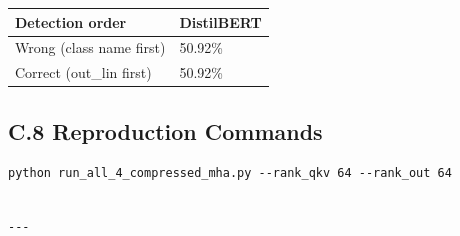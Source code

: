 \begin{table}[H]
\centering
\small
\begin{tabular}{ll}
\toprule
\textbf{Detection order} & \textbf{DistilBERT} \\
\midrule
Wrong (class name first) & 50.92\% \\
Correct (out\_lin first) & 50.92\% \\
\bottomrule
\end{tabular}
\end{table}

\subsection{C.8 Reproduction Commands}

\begin{lstlisting}
python run_all_4_compressed_mha.py --rank_qkv 64 --rank_out 64
\end{lstlisting}
\begin{lstlisting}

---
\end{lstlisting}